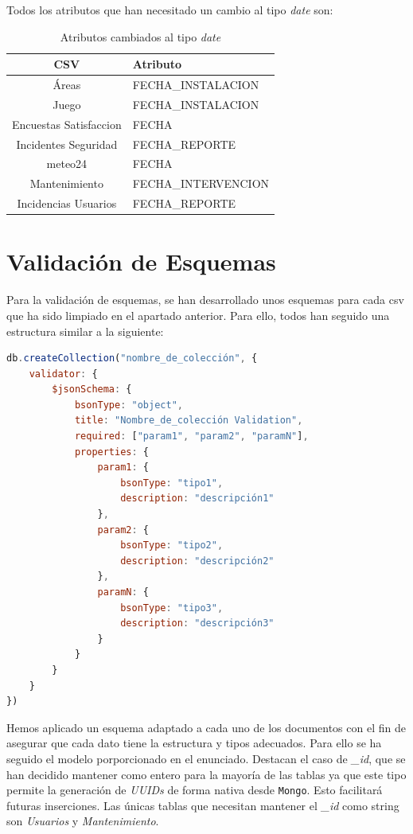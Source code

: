 \documentclass[]{article}
\begin{document}
Todos los atributos que han necesitado un cambio al tipo \textit{date} son:

\begin{table}[H]
    \centering
    \begin{tabular}{| c | l | }
        \hline
        CSV & Atributo \\ \hline
        Áreas & FECHA\_INSTALACION \\
        Juego & FECHA\_INSTALACION \\ 
        Encuestas Satisfaccion & FECHA\\ 
        Incidentes Seguridad & FECHA\_REPORTE \\ 
        meteo24 & FECHA\\ 
        Mantenimiento & FECHA\_INTERVENCION\\ 
        Incidencias Usuarios & FECHA\_REPORTE\\ 
        \hline
    \end{tabular}
    \caption{Atributos cambiados al tipo \textit{date}}
\end{table}

\newpage
\section{Validación de Esquemas}
\label{sec:validacion}
Para la validación de esquemas, se han desarrollado unos esquemas para cada csv que ha sido limpiado en el apartado anterior. Para ello, todos han seguido una estructura similar a la siguiente:

\begin{lstlisting}[language=JavaScript, caption=Estructura genérica de la validación de esquemas]
db.createCollection("nombre_de_colección", {
    validator: {
        $jsonSchema: {
            bsonType: "object",
            title: "Nombre_de_colección Validation",
            required: ["param1", "param2", "paramN"],
            properties: {
                param1: {
                    bsonType: "tipo1",
                    description: "descripción1"
                },
                param2: {
                    bsonType: "tipo2",
                    description: "descripción2"
                },
                paramN: {
                    bsonType: "tipo3",
                    description: "descripción3"
                }
            }
        }
    }
})
\end{lstlisting}

Hemos aplicado un esquema adaptado a cada uno de los documentos con el fin de asegurar que cada dato tiene la estructura y tipos adecuados. Para ello se ha seguido el modelo porporcionado en el enunciado. Destacan el caso de \textit{\_id}, que se han decidido mantener como entero para la mayoría de las tablas ya que este tipo permite la generación de \textit{UUIDs} de forma nativa desde \texttt{Mongo}. Esto facilitará futuras inserciones. Las únicas tablas que necesitan mantener el \textit{\_id} como string son \textit{Usuarios} y \textit{Mantenimiento}. 
\end{document}
